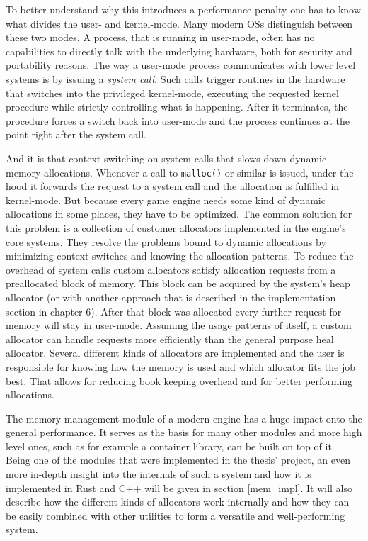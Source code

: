 To better understand why this introduces a performance penalty one has to know what divides the user- and kernel-mode. Many modern \acp{OS} distinguish between these two modes. A process, that is running in user-mode, often has no capabilities to directly talk with the underlying hardware, both for security and portability reasons. The way a user-mode process communicates with lower level systems is by issuing a \textit{system call}. Such calls trigger routines in the hardware that switches into the privileged kernel-mode, executing the requested kernel procedure while strictly controlling what is happening. After it terminates, the procedure forces a switch back into user-mode and the process continues at the point right after the system call.\cite{LinuxKernel}

And it is that context switching on system calls that slows down dynamic memory allocations. Whenever a call to \texttt{malloc()} or similar is issued, under the hood it forwards the request to a system call and the allocation is fulfilled in kernel-mode. But because every game engine needs some kind of dynamic allocations in some places, they have to be optimized. The common solution for this problem is a collection of customer allocators implemented in the engine's core systems. They resolve the problems bound to dynamic allocations by minimizing context switches and knowing the allocation patterns.
To reduce the overhead of system calls custom allocators satisfy allocation requests from a preallocated block of memory. This block can be acquired by the system's heap allocator (or with another approach that is described in the implementation section in chapter 6). After that block was allocated every further request for memory will stay in user-mode. Assuming the usage patterns of itself, a custom allocator can handle requests more efficiently than the general purpose heal allocator. Several different kinds of allocators are implemented and the user is responsible for knowing how the memory is used and which allocator fits the job best. That allows for reducing book keeping overhead and for better performing allocations.

The memory management module of a modern engine has a huge impact onto the general performance. It serves as the basis for many other modules and more high level ones, such as for example a container library, can be built on top of it. Being one of the modules that were implemented in the thesis' project, an even more in-depth insight into the internals of such a system and how it is implemented in Rust and C++ will be given in section \ref{mem_impl}. It will also describe how the different kinds of allocators work internally and how they can be easily combined with other utilities to form a versatile and well-performing system.

